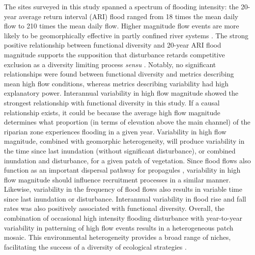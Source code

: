 The sites surveyed in this study spanned a spectrum of flooding intensity: the 20-year average return interval (ARI) flood ranged from 18 times the mean daily flow to 210 times the mean daily flow. Higher magnitude flow events are more likely to be geomorphically effective in partly confined river systems \citep{Huang2006}. The strong positive relationship between functional diversity and 20-year ARI flood magnitude supports the supposition that disturbance retards competitive exclusion as a diversity limiting process \textit{sensu} \citet{Huston1979}. Notably, no significant relationships were found between functional diversity and metrics describing mean high flow conditions, whereas metrics describing variability had high explanatory power. Interannual variability in high flow magnitude showed the strongest relationship with functional diversity in this study. If a causal relationship exists, it could be because the average high flow magnitude determines what proportion (in terms of elevation above the main channel) of the riparian zone experiences flooding in a given year. Variability in high flow magnitude, combined with geomorphic heterogeneity, will produce variability in the time since last inundation (without significant disturbance), or combined inundation and disturbance, for a given patch of vegetation. Since flood flows also function as an important dispersal pathway for propagules \citep{Merritt2010a}, variability in high flow magnitude should influence recruitment processes in a similar manner.  Likewise, variability in the frequency of flood flows also results in variable time since last inundation or disturbance. Interannual variability in flood rise and fall rates was also positively associated with functional diversity. Overall, the combination of occasional high intensity flooding disturbance with year-to-year variability in patterning of high flow events results in a heterogeneous patch mosaic. This environmental heterogeneity provides a broad range of niches, facilitating the success of a diversity of ecological strategies \citep{Bornette2008}.
 
